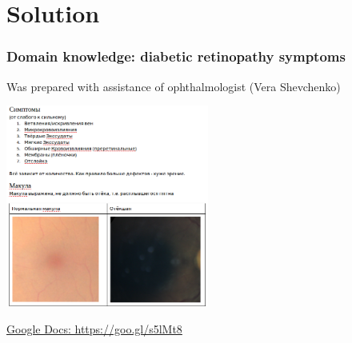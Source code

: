 \documentclass{beamer}
\begin{document}
\begin{frame}
\begin{center}
\end{center}
\end{frame}





\section{Solution}

\begin{frame}\frametitle{Domain knowledge: diabetic retinopathy symptoms}

\small Was prepared with assistance of ophthalmologist (Vera Shevchenko)

\begin{center}
\par \includegraphics[interpolate=true,valign=c,width=0.5\textwidth]{pics/symptoms_pic.png}
\vspace{5pt}
\par \hyperlink{https://goo.gl/s5lMt8}{Google Docs: https://goo.gl/s5lMt8}
\end{center}

\end{frame}
\end{document}
